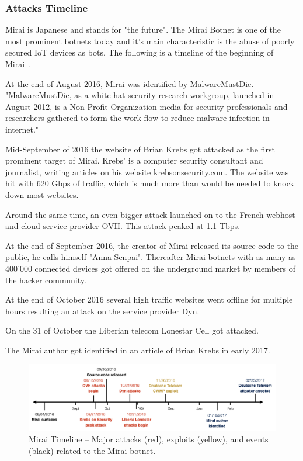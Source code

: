 \subsubsection{Attacks Timeline}
Mirai is Japanese and stands for "the future".
The Mirai Botnet is one of the most prominent botnets today and it's main characteristic is the abuse of poorly secured IoT devices as bots.
The following is a timeline of the beginning of Mirai~\cite{Kolias17,Antonakakis17}.

At the end of August 2016, Mirai was identified by MalwareMustDie.
"MalwareMustDie, as a white-hat security research workgroup, launched in August 2012, is a Non Profit Organization media for security professionals and researchers gathered to form the work-flow to reduce malware infection in internet."\cite{MalwareMustDie}

Mid-September of 2016 the website of Brian Krebs got attacked as the first prominent target of Mirai.
Krebs' is a computer security consultant and journalist, writing articles on his website krebsonsecurity.com.
The website was hit with 620 Gbps of traffic, which is much more than would be needed to knock down most websites.\cite{Krebs16_2}

Around the same time, an even bigger attack launched on to the French webhost and cloud service provider OVH. This attack peaked at 1.1 Tbps.

At the end of September 2016, the creator of Mirai released its source code to the public, he calls himself "Anna-Senpai".
Thereafter Mirai botnets with as many as 400'000 connected devices got offered on the underground market by members of the hacker community.

At the end of October 2016 several high traffic websites went offline for multiple hours resulting an attack on the service provider Dyn.

On the 31 of October the Liberian telecom Lonestar Cell got attacked.

The Mirai author got identified in an article of Brian Krebs in early 2017.\cite{Krebs17}

\begin{figure}[ht]
\begin{center} \includegraphics[scale=0.35]{Talk11/mirai-timeline} \end{center}
\caption{Mirai Timeline -- Major attacks (red), exploits (yellow), and events (black) related to the Mirai botnet.\cite{Antonakakis17}}
\label{fig:timeline}
\end{figure}

